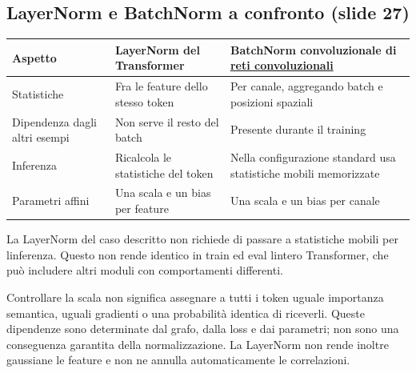 \documentclass[11pt,a4paper,oneside,openany]{book}
\begin{document}
\subsection{LayerNorm e BatchNorm a confronto (slide 27)}\label{f04-r474}

\begin{longtable}[]{@{}
  >{\raggedright\arraybackslash}p{}
  >{\raggedright\arraybackslash}p{}
  >{\raggedright\arraybackslash}p{}@{}}
\toprule\noalign{}
\begin{minipage}[b]{\linewidth}\raggedright
Aspetto
\end{minipage} & \begin{minipage}[b]{\linewidth}\raggedright
LayerNorm del Transformer
\end{minipage} & \begin{minipage}[b]{\linewidth}\raggedright
BatchNorm convoluzionale di \hyperref[fonte02]{reti convoluzionali}
\end{minipage} \\
\midrule\noalign{}
\endhead
\bottomrule\noalign{}
\endlastfoot
Statistiche & Fra le feature dello stesso token & Per canale, aggregando batch e posizioni spaziali \\
Dipendenza dagli altri esempi & Non serve il resto del batch & Presente durante il training \\
Inferenza & Ricalcola le statistiche del token & Nella configurazione standard usa statistiche mobili memorizzate \\
Parametri affini & Una scala e un bias per feature & Una scala e un bias per canale \\
\end{longtable}

La LayerNorm del caso descritto non richiede di passare a statistiche mobili per l\textquotesingle inferenza. Questo non rende identico in train ed eval l\textquotesingle intero Transformer, che può includere altri moduli con comportamenti differenti.

Controllare la scala non significa assegnare a tutti i token uguale importanza semantica, uguali gradienti o una probabilità identica di riceverli. Queste dipendenze sono determinate dal grafo, dalla loss e dai parametri; non sono una conseguenza garantita della normalizzazione. La LayerNorm non rende inoltre gaussiane le feature e non ne annulla automaticamente le correlazioni.
\end{document}
